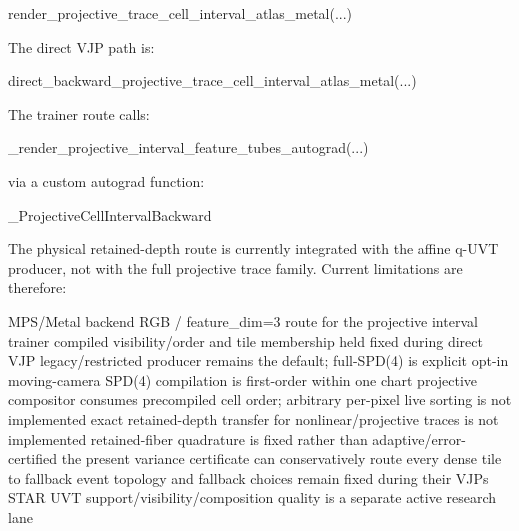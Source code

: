 \documentclass[
]{article}
\newenvironment{Shaded}{}{}
\newcommand{\NormalTok}[1]{#1}
\begin{document}
\begin{Shaded}
\begin{Highlighting}[]
\NormalTok{render\_projective\_trace\_cell\_interval\_atlas\_metal(...)}
\end{Highlighting}
\end{Shaded}

The direct VJP path is:

\begin{Shaded}
\begin{Highlighting}[]
\NormalTok{direct\_backward\_projective\_trace\_cell\_interval\_atlas\_metal(...)}
\end{Highlighting}
\end{Shaded}

The trainer route calls:

\begin{Shaded}
\begin{Highlighting}[]
\NormalTok{\_render\_projective\_interval\_feature\_tubes\_autograd(...)}
\end{Highlighting}
\end{Shaded}

via a custom autograd function:

\begin{Shaded}
\begin{Highlighting}[]
\NormalTok{\_ProjectiveCellIntervalBackward}
\end{Highlighting}
\end{Shaded}

The physical retained-depth route is currently integrated with the
affine q-UVT producer, not with the full projective trace family.
Current limitations are therefore:

\begin{Shaded}
\begin{Highlighting}[]
\NormalTok{MPS/Metal backend}
\NormalTok{RGB / feature\_dim=3 route for the projective interval trainer}
\NormalTok{compiled visibility/order and tile membership held fixed during direct VJP}
\NormalTok{legacy/restricted producer remains the default; full{-}SPD(4) is explicit opt{-}in}
\NormalTok{moving{-}camera SPD(4) compilation is first{-}order within one chart}
\NormalTok{projective compositor consumes precompiled cell order; arbitrary per{-}pixel live sorting is not implemented}
\NormalTok{exact retained{-}depth transfer for nonlinear/projective traces is not implemented}
\NormalTok{retained{-}fiber quadrature is fixed rather than adaptive/error{-}certified}
\NormalTok{the present variance certificate can conservatively route every dense tile to fallback}
\NormalTok{event topology and fallback choices remain fixed during their VJPs}
\NormalTok{STAR UVT support/visibility/composition quality is a separate active research lane}
\end{Highlighting}
\end{Shaded}
\end{document}
